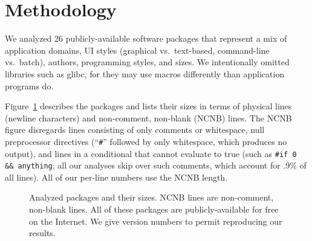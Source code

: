 \documentclass[10pt]{article}
\def\numpackages{26}
\newcommand{\pkg}[1]{\textsf{#1}}
\newcommand{\captionsmall}[1]{\caption[]{\small #1}}
\begin{document}
%






\section{Methodology}
\label{sec:methodology}


We analyzed {\numpackages} publicly-available software packages that
represent a mix of application domains, UI styles (graphical vs.\ 
text-based, command-line vs.\ batch), authors, programming styles, and
sizes.  We intentionally omitted libraries such as \pkg{glibc}, for they
may use macros differently than application programs do.

Figure~\ref{fig:packages} describes the packages and lists their sizes in
terms of physical lines (newline characters) and non-comment, non-blank
(NCNB) lines.  The NCNB figure disregards lines consisting of only comments
or whitespace, null preprocessor directives (``{\tt \#}'' followed by only
whitespace, which produces no output), and lines in a conditional that
cannot evaluate to true (such as {\tt \#if 0 \&\& anything}; all our
analyses skip over such comments, which account for .9\% of all lines).
All of our per-line numbers use the NCNB length.


\begin{figure}
\centering
{\small
  \setlength{\tabcolsep}{.25em}
  
}
\captionsmall{Analyzed packages and their sizes.  NCNB lines are non-comment,
  non-blank lines.  All of these packages are publicly-available for free
  on the Internet.  We give version numbers to permit reproducing our results.}
\label{fig:packages}
\end{figure}
\end{document}
